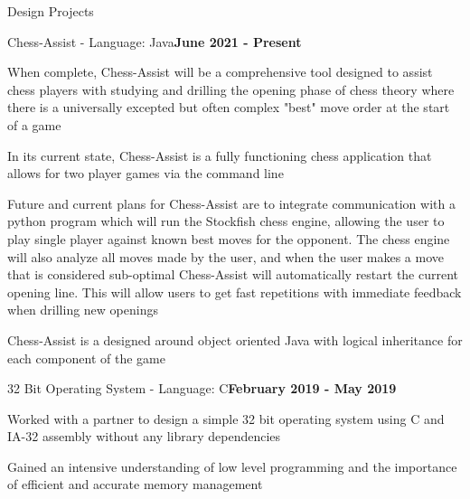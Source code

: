 \documentclass{resume} %
\begin{document}

\begin{rSection}{Design Projects}
	
	\begin{rSubsection}{Chess-Assist - Language: Java}{\bf June 2021 - Present}{}{}
		
		\item When complete, Chess-Assist will be a comprehensive tool designed to assist chess players with studying and drilling the opening phase of chess theory where there is a universally excepted but often complex "best" move order at the start of a game
		
		\item In its current state, Chess-Assist is a fully functioning chess application that allows for two player games via the command line
		
		\item Future and current plans for Chess-Assist are to integrate communication with a python program which will run the Stockfish chess engine, allowing the user to play single player against known best moves for the opponent. The chess engine will also analyze all moves made by the user, and when the user makes a move that is considered sub-optimal Chess-Assist will automatically restart the current opening line. This will allow users to get fast repetitions with immediate feedback when drilling new openings
		
		\item Chess-Assist is a designed around object oriented Java with logical inheritance for each component of the game
		
	\end{rSubsection}
	
	\begin{rSubsection}{32 Bit Operating System - Language: C}{\bf February 2019 - May 2019}{}{}
		
		\item Worked with a partner to design a simple 32 bit operating system using C and IA-32 assembly without any library dependencies
		
		\item Gained an intensive understanding of low level programming and the importance of efficient and accurate memory management
		

\end{rSubsection}
\end{rSection}
\end{document}
